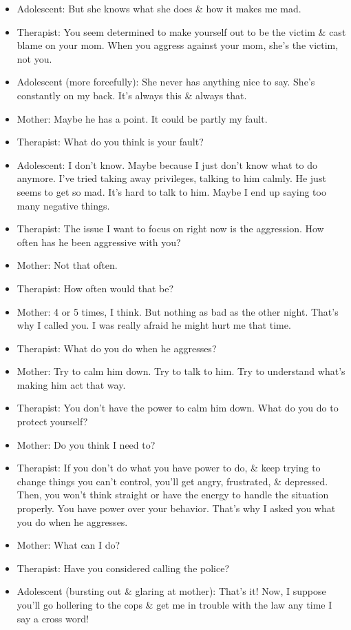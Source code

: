 \documentclass{article}
\numberwithin{equation}{section}
\begin{document}
\begin{itemize}
	\item Adolescent: But she knows what she does \& how it makes me mad.
	\item Therapist: You seem determined to make yourself out to be the victim \& cast blame on your mom. When you aggress against your mom, she's the victim, not you.
	\item Adolescent (more forcefully): She never has anything nice to say. She's constantly on my back. It's always this \& always that.
	\item Mother: Maybe he has a point. It could be partly my fault.
	\item Therapist: What do you think is your fault?
	\item Adolescent: I don't know. Maybe because I just don't know what to do anymore. I've tried taking away privileges, talking to him calmly. He just seems to get so mad. It's hard to talk to him. Maybe I end up saying too many negative things.
	\item Therapist: The issue I want to focus on right now is the aggression. How often has he been aggressive with you?
	\item Mother: Not that often.
	\item Therapist: How often would that be?
	\item Mother: 4 or 5 times, I think. But nothing as bad as the other night. That's why I called you. I was really afraid he might hurt me that time.
	\item Therapist: What do you do when he aggresses?
	\item Mother: Try to calm him down. Try to talk to him. Try to understand what's making him act that way.
	\item Therapist: You don't have the power to calm him down. What do you do to protect yourself?
	\item Mother: Do you think I need to?
	\item Therapist: If you don't do what you have power to do, \& keep trying to change things you can't control, you'll get angry, frustrated, \& depressed. Then, you won't think straight or have the energy to handle the situation properly. You have power over your behavior. That's why I asked you what you do when he aggresses.
	\item Mother: What can I do?
	\item Therapist: Have you considered calling the police?
	\item Adolescent (bursting out \& glaring at mother): That's it! Now, I suppose you'll go hollering to the cops \& get me in trouble with the law any time I say a cross word!

\end{itemize}
\end{document}

